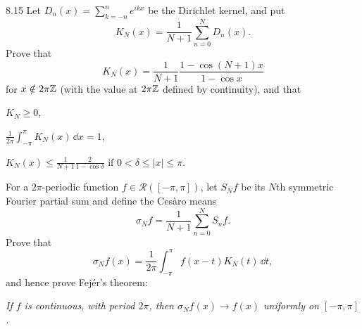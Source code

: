 \documentclass[11pt, oneside]{article}
\begin{document}
\begin{exercise}{8.15}
Let $D_n(x)=\sum_{k=-n}^n e^{ikx}$ be the Dirichlet kernel, and put
\[
 K_N(x)=\frac1{N+1}\sum_{n=0}^N D_n(x).
\]
Prove that
\[
 K_N(x)=\frac1{N+1}\frac{1-\cos(N+1)x}{1-\cos x}
\]
for $x\notin2\pi\mathbb{Z}$ (with the value at $2\pi\mathbb{Z}$ defined by continuity), and that
\begin{exercisesubparts}
\item $K_N\ge0$,
\item $\displaystyle\frac1{2\pi}\int_{-\pi}^\pi K_N(x)\,\dd x=1$,
\item $\displaystyle K_N(x)\le\frac1{N+1}\frac2{1-\cos\delta}$ if $0<\delta\le|x|\le\pi$.
\end{exercisesubparts}
For a $2\pi$-periodic function $f\in\mathcal{R}([-\pi, \pi])$, let $S_Nf$ be its $N$th symmetric Fourier partial sum and define the Ces\`aro means
\[
 \sigma_Nf=\frac1{N+1}\sum_{n=0}^N S_nf.
\]
Prove that
\[
 \sigma_Nf(x)=\frac1{2\pi}\int_{-\pi}^\pi f(x-t)K_N(t)\,\dd t,
\]
and hence prove Fej\'er's theorem:

\emph{If $f$ is continuous, with period $2\pi$, then $\sigma_Nf(x)\to f(x)$ uniformly on $[-\pi, \pi]$.}
\end{exercise}
\end{document}
